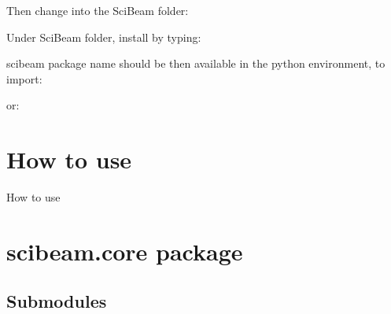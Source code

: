 \documentclass[letterpaper,10pt,english]{sphinxmanual}
\begin{document}
Then change into the SciBeam folder:

%
\begin{sphinxVerbatim}[commandchars=\\\{\}]
 
\end{sphinxVerbatim}

Under SciBeam folder, install by typing:

%
\begin{sphinxVerbatim}[commandchars=\\\{\}]
  
\end{sphinxVerbatim}

scibeam package name should be then available in the python environment, to import:

%
\begin{sphinxVerbatim}[commandchars=\\\{\}]
 
\end{sphinxVerbatim}

or:

%
\begin{sphinxVerbatim}[commandchars=\\\{\}]
   
\end{sphinxVerbatim}


\chapter{How to use}
\label{\detokenize{how_to_use:how-to-use}}\label{\detokenize{how_to_use::doc}}
How to use


\chapter{scibeam.core package}
\label{\detokenize{scibeam.core:scibeam-core-package}}\label{\detokenize{scibeam.core::doc}}

\section{Submodules}
\label{\detokenize{scibeam.core:submodules}}
\end{document}
